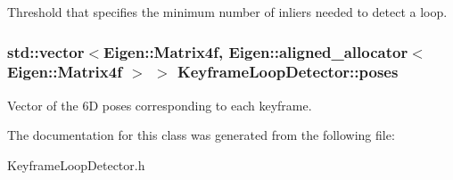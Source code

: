 \label{class_keyframe_loop_detector_a88bfa794730e06898b2f9aede72f22ca}
Threshold that specifies the minimum number of inliers needed to detect a loop. \hypertarget{class_keyframe_loop_detector_a486f9714c66706b85febede7f3653676}{
\subsubsection[{poses}]{\setlength{\rightskip}{0pt plus 5cm}std::vector$<$Eigen::Matrix4f, Eigen::aligned\_\-allocator$<$Eigen::Matrix4f $>$ $>$ {\bf KeyframeLoopDetector::poses}}}
\label{class_keyframe_loop_detector_a486f9714c66706b85febede7f3653676}
Vector of the 6D poses corresponding to each keyframe. 

The documentation for this class was generated from the following file:\begin{DoxyCompactItemize}
\item 
KeyframeLoopDetector.h\end{DoxyCompactItemize}
